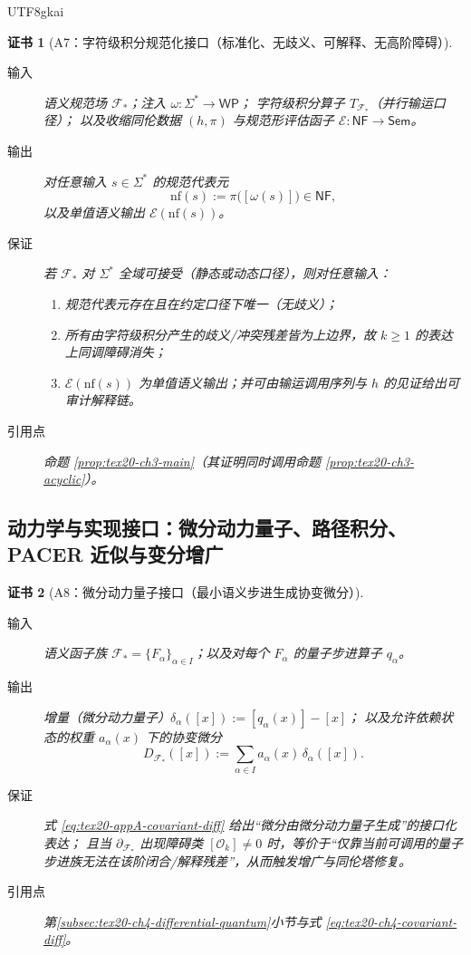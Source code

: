 \documentclass[12pt]{article}
\newtheorem{Certificate}{证书}[section]
\begin{document}
\begin{CJK*}{UTF8}{gkai}
\begin{Certificate}[A7：字符级积分规范化接口（标准化、无歧义、可解释、无高阶障碍）]
\label{cert:tex20-appA-character-integral-normalization-interface}
\begin{description}
  \item[输入] 语义规范场 $\mathcal{F}_\ast$；注入 $\omega:\Sigma^\ast\to\mathsf{WP}$；
  字符级积分算子 $T_{\mathcal{F}_\ast}$（并行输运口径）；
  以及收缩同伦数据 $(h,\pi)$ 与规范形评估函子 $\mathcal{E}:\mathsf{NF}\to\mathsf{Sem}$。
  \item[输出] 对任意输入 $s\in\Sigma^\ast$ 的规范代表元
  \[
  \mathrm{nf}(s):=\pi\bigl([\omega(s)]\bigr)\in\mathsf{NF},
  \]
  以及单值语义输出 $\mathcal{E}(\mathrm{nf}(s))$。
  \item[保证] 若 $\mathcal{F}_\ast$ 对 $\Sigma^\ast$ 全域可接受（静态或动态口径），则对任意输入：
  \begin{enumerate}
    \item 规范代表元存在且在约定口径下唯一（无歧义）；
    \item 所有由字符级积分产生的歧义/冲突残差皆为上边界，故 $k\ge 1$ 的表达上同调障碍消失；
    \item $\mathcal{E}(\mathrm{nf}(s))$ 为单值语义输出；并可由输运调用序列与 $h$ 的见证给出可审计解释链。
  \end{enumerate}
  \item[引用点] 命题 \ref{prop:tex20-ch3-main}（其证明同时调用命题 \ref{prop:tex20-ch3-acyclic}）。
\end{description}
\end{Certificate}

\subsection{动力学与实现接口：微分动力量子、路径积分、PACER 近似与变分增广}
\label{subsec:tex20-appA-dynamics}

\begin{Certificate}[A8：微分动力量子接口（最小语义步进生成协变微分）]
\label{cert:tex20-appA-mdq-differential-interface}
\begin{description}
  \item[输入] 语义函子族 $\mathcal{F}_\ast=\{F_\alpha\}_{\alpha\in I}$；以及对每个 $F_\alpha$ 的量子步进算子 $q_\alpha$。
  \item[输出] 增量（微分动力量子）$\delta_\alpha([x]):=[q_\alpha(x)]-[x]$；
  以及允许依赖状态的权重 $a_\alpha(x)$ 下的协变微分
  \[
  D_{\mathcal{F}_\ast}([x]) := \sum_{\alpha\in I} a_\alpha(x)\,\delta_\alpha([x]).
  \tag{A8.1}
  \label{eq:tex20-appA-covariant-diff}
  \]
  \item[保证] 式 \eqref{eq:tex20-appA-covariant-diff} 给出“微分由微分动力量子生成”的接口化表达；
  且当 $\partial_{\mathcal{F}_\ast}$ 出现障碍类 $[\mathcal{O}_k]\neq 0$ 时，等价于“仅靠当前可调用的量子步进族无法在该阶闭合/解释残差”，从而触发增广与同伦塔修复。
  \item[引用点] 第\ref{subsec:tex20-ch4-differential-quantum}小节与式 \eqref{eq:tex20-ch4-covariant-diff}。
\end{description}
\end{Certificate}


\end{CJK*}
\end{document}

